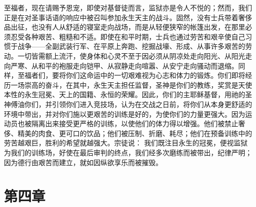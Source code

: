 至福者，现在请赐予恩宠，即使对基督徒而言，监狱亦是令人不悦的；然而，我们正是在对圣事话语的响应中被召叫参加永生天主的战斗。固然，没有士兵带着奢侈品出征，也没有人从舒适的寝室走向战场，而是从轻便狭窄的帐篷出发，在那里必须忍受各种艰苦、粗糙和不适。即使在和平时期，士兵也通过劳苦和艰辛使自己习惯于战争——全副武装行军、在平原上奔跑、挖掘战壕、形成、从事许多艰苦的劳动。一切皆需额上流汗，使身体和心灵不至于因必须从阴凉处走向阳光、从阳光走向严寒、从和平的袍服走向铠甲、从寂静走向喧嚣、从安宁走向骚动而退缩。同样，至福者们，要将你们这命运中的一切艰难视为心志和体力的锻炼。你们即将经历一场崇高的奋斗，在其中，永生天主担任监督，圣神是你们的教练，奖赏是天使本性的永生冠冕、天上的国籍、永恒的荣耀。因此，你们的主耶稣基督，用祂的圣神傅油你们，并引领你们进入竞技场，认为在交战之日前，将你们从本身更舒适的环境中带出，并对你们施以更艰苦的训练是好的，为使你们的力量更强大。因为运动员也被隔离出来接受更严格的训练，以使他们的体力得以增强。他们被禁止奢侈、精美的肉食、更可口的饮品；他们被压制、折磨、耗尽；他们在预备训练中的劳苦越艰巨，胜利的希望就越强大。宗徒说：  我们既注目永生的冠冕，便视监狱为我们的训练场，好使在最后审判的终点，我们经多次磨练而被带出，纪律严明；因为德行由艰苦而建立，就如因纵欲享乐而被摧毁。\par


\section{第四章}


